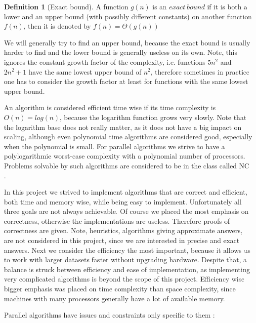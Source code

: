 \documentclass{report}
\theoremstyle{plain}
\theoremstyle{definition}
\newtheorem{definition}{Definition}
\theoremstyle{remark}
\numberwithin{definition}{chapter}
\numberwithin{example}{chapter}
\numberwithin{figure}{chapter}
\numberwithin{theorem}{chapter}
\numberwithin{lemma}{chapter}
\begin{document}
\begin{definition}[Exact bound]
A function $g(n)$ is an $exact \ bound$ if it is both a lower and an upper bound (with possibly different constants) on another function $f(n)$, then it is denoted by $f(n) = \Theta(g(n))$
\end{definition}

We will generally try to find an upper bound, because the exact bound is usually harder to find and the lower bound is generally useless on its own. Note, this ignores the constant growth factor of the complexity, i.e. functions $5n^2$ and $2n^2+1$ have the same lowest upper bound of $n^2$, therefore sometimes in practice one has to consider the growth factor at least for functions with the same lowest upper bound.

An algorithm is considered efficient time wise if its time complexity is $O(n)=log(n)$, because the logarithm function grows very slowly. Note that the logarithm base does not really matter, as it does not have a big impact on scaling, although even polynomial time algorithms are considered good, especially when the polynomial is small. For parallel algorithms we strive to have a polylogarithmic worst-case complexity with a polynomial number of processors. Problems solvable by such algorithms are considered to be in the class called NC \cite{berman1996fundamentals}.

In this project we strived to implement algorithms that are correct and efficient, both time and memory wise, while being easy to implement. Unfortunately all three goals are not always achievable. Of course we placed the most emphasis on correctness, otherwise the implementations are useless. Therefore proofs of correctness are given. Note, heuristics, algorithms giving approximate answers, are not considered in this project, since we are interested in precise and exact answers. Next we consider the efficiency the most important, because it allows us to work with larger datasets faster without upgrading hardware. Despite that, a balance is struck between efficiency and ease of implementation, as implementing very complicated algorithms is beyond the scope of this project. Efficiency wise bigger emphasis was placed on time complexity than space complexity, since machines with many processors generally have a lot of available memory.

Parallel algorithms have issues and constraints only specific to them \cite{berman1996fundamentals}:
\end{document}
